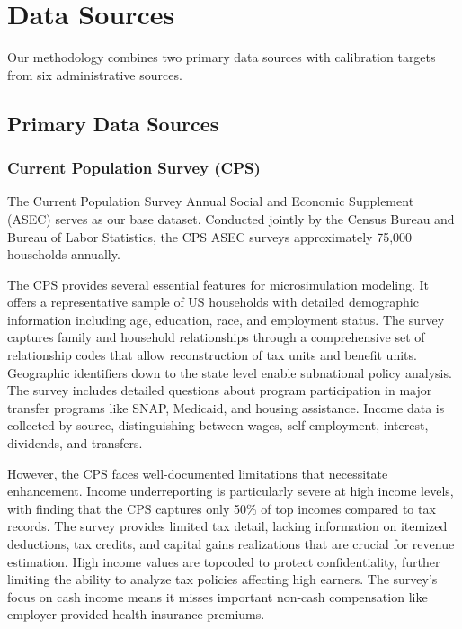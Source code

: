 \section{Data Sources}

Our methodology combines two primary data sources with calibration targets from six administrative sources.

\subsection{Primary Data Sources}

\subsubsection{Current Population Survey (CPS)}

The Current Population Survey Annual Social and Economic Supplement (ASEC) serves as our base dataset. Conducted jointly by the Census Bureau and Bureau of Labor Statistics, the CPS ASEC surveys approximately 75,000 households annually.

The CPS provides several essential features for microsimulation modeling. It offers a representative sample of US households with detailed demographic information including age, education, race, and employment status. The survey captures family and household relationships through a comprehensive set of relationship codes that allow reconstruction of tax units and benefit units. Geographic identifiers down to the state level enable subnational policy analysis. The survey includes detailed questions about program participation in major transfer programs like SNAP, Medicaid, and housing assistance. Income data is collected by source, distinguishing between wages, self-employment, interest, dividends, and transfers.

However, the CPS faces well-documented limitations that necessitate enhancement. Income underreporting is particularly severe at high income levels, with \citep{bee2021} finding that the CPS captures only 50\% of top incomes compared to tax records. The survey provides limited tax detail, lacking information on itemized deductions, tax credits, and capital gains realizations that are crucial for revenue estimation. High income values are topcoded to protect confidentiality, further limiting the ability to analyze tax policies affecting high earners. The survey's focus on cash income means it misses important non-cash compensation like employer-provided health insurance premiums.

